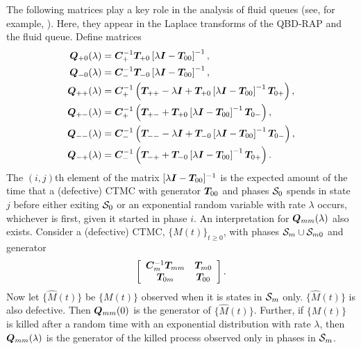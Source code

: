 The following matrices play a key role in the analysis of fluid queues (see, for example, \cite{bean2009}). Here, they appear in the Laplace transforms of the QBD-RAP and the fluid queue. Define matrices
\begin{align*}
	\boldsymbol Q_{+0}(\lambda) &= \boldsymbol C_+^{-1}\boldsymbol T_{+0}\left[\lambda \boldsymbol I - \boldsymbol T_{00}\right]^{-1},
	\\\boldsymbol Q_{-0}(\lambda) &= \boldsymbol C_-^{-1}\boldsymbol T_{-0}\left[\lambda \boldsymbol I - \boldsymbol T_{00}\right]^{-1},
	\\\boldsymbol Q_{++}(\lambda) &= \boldsymbol C_+^{-1} \left(\boldsymbol T_{++} - \lambda \boldsymbol I + \boldsymbol T_{+0}\left[\lambda \boldsymbol I - \boldsymbol T_{00}\right]^{-1}\boldsymbol T_{0+}\right),
	\\\boldsymbol Q_{+-}(\lambda) &= \boldsymbol C_+^{-1} \left(\boldsymbol T_{+-} + \boldsymbol T_{+0}\left[\lambda \boldsymbol I - \boldsymbol T_{00}\right]^{-1}\boldsymbol T_{0-} \right) ,
	\\\boldsymbol Q_{--}(\lambda) &= \boldsymbol C_-^{-1} \left(\boldsymbol T_{--}  - \lambda \boldsymbol I + \boldsymbol T_{-0}\left[\lambda \boldsymbol I - \boldsymbol T_{00}\right]^{-1}\boldsymbol T_{0-}\right),
	\\\boldsymbol Q_{-+}(\lambda) &=\boldsymbol C_-^{-1} \left(\boldsymbol T_{-+}+ \boldsymbol T_{-0}\left[\lambda \boldsymbol I - \boldsymbol T_{00}\right]^{-1}\boldsymbol T_{0+}\right).
\end{align*}
The \((i,j)\)th element of the matrix \([\lambda\boldsymbol I-\boldsymbol T_{00}]^{-1}\) is the expected amount of the time that a (defective) CTMC with generator \(\boldsymbol T_{00}\) and phases \(\mathcal{S}_0\) spends in state \(j\) before either exiting \(\mathcal{S}_0\) or an exponential random variable with rate \(\lambda \) occurs, whichever is first, given it started in phase \(i\). An interpretation for \(\boldsymbol Q_{mm}(\lambda)\) also exists. Consider a (defective) CTMC, \(\{M(t)\}_{t\geq 0}\), with phases \(\mathcal{S}_m\cup\mathcal{S}_{m0}\) and generator 
\[\left[\begin{array}{cc}
	\boldsymbol C_{m}^{-1}\boldsymbol T_{mm} & \boldsymbol T_{m0} \\ \boldsymbol T_{0m} & \boldsymbol T_{00}
\end{array}\right].\]
Now let \(\{\widehat M(t)\}\) be \(\{M(t)\}\) observed when it is states in \(\mathcal{S}_m\) only. \(\{\widehat M(t)\}\) is also defective. Then \(\boldsymbol Q_{mm}(0)\) is the generator of \(\{\widehat M(t)\}\). Further, if \(\{M(t)\}\) is killed after a random time with an exponential distribution with rate \(\lambda\), then \(\boldsymbol Q_{mm}(\lambda)\) is the generator of the killed process observed only in phases in \(\mathcal{S}_m\). 

